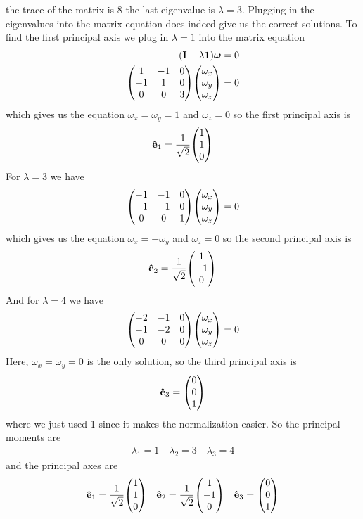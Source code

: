 \documentclass[../hw.tex]{subfiles}
\begin{document}
the trace of the matrix is $8$ the last eigenvalue is $\lambda = 3$. Plugging in the eigenvalues
into the matrix equation does indeed give us the correct solutions. To find the first principal axis
we plug in $\lambda = 1$ into the matrix equation
\begin{align*}
    (\vb I - \lambda \vb 1) \vb*\omega = 0 \\
    \mqty(1 & -1 & 0 \\
        -1 & 1 & 0 \\
        0 & 0 & 3) \mqty(\omega_x \\ \omega_y \\ \omega_z) = 0
\end{align*}
which gives us the equation $\omega_x = \omega_y = 1$ and $\omega_z = 0$ so the first principal axis is 
\begin{align*}
    \vu e_1 = \frac{1}{\sqrt{2}} \mqty(1 \\ 1 \\ 0)
\end{align*}
For $\lambda = 3$ we have 
\begin{align*}
    \mqty(-1 & -1 & 0 \\
        -1 & -1 & 0 \\
        0 & 0 & 1) \mqty(\omega_x \\ \omega_y \\ \omega_z) = 0
\end{align*}
which gives us the equation $\omega_x = -\omega_y$ and $\omega_z = 0$ so the second principal axis is
\begin{align*}
    \vu e_2 = \frac{1}{\sqrt{2}} \mqty(1 \\ -1 \\ 0)
\end{align*}
And for $\lambda = 4$ we have
\begin{align*}
    \mqty(-2 & -1 & 0 \\
        -1 & -2 & 0 \\
        0 & 0 & 0) \mqty(\omega_x \\ \omega_y \\ \omega_z) = 0
\end{align*}
Here, $\omega_x = \omega_y = 0$ is the only solution, so the third principal axis is
\begin{align*}
    \vu e_3 = \mqty(0 \\ 0 \\ 1)
\end{align*}
where we just used 1 since it makes the normalization easier. So the principal moments are
\begin{align*}
    \lambda_1 = 1 \quad \lambda_2 = 3 \quad \lambda_3 = 4
\end{align*}
and the principal axes are
\begin{align*}
    \vu e_1 = \frac{1}{\sqrt{2}} \mqty(1 \\ 1 \\ 0) \quad 
    \vu e_2 = \frac{1}{\sqrt{2}} \mqty(1 \\ -1 \\ 0) \quad 
    \vu e_3 = \mqty(0 \\ 0 \\ 1)
\end{align*}
\end{document}
